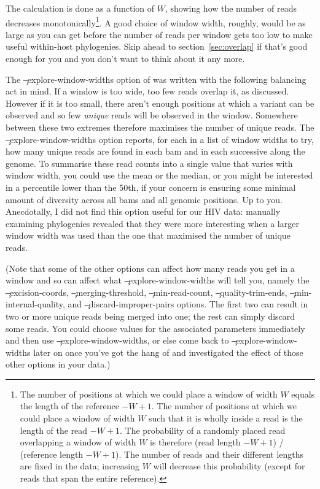 The calculation is done as a function of $W$, showing how the number of reads decreases monotonically\footnote{
The number of positions at which we could place a window of width $W$ equals the length of the reference $- W + 1$.
The number of positions at which we could place a window of width $W$ such that it is wholly inside a read is the length of the read $- W + 1$.
The probability of a randomly placed read overlapping a window of width $W$ is therefore (read length $- W + 1$) / (reference length $- W + 1$).
The number of reads and their different lengths are fixed in the data; increasing $W$ will decrease this probability (except for reads that span the entire reference).}.
A good choice of window width, roughly, would be as large as you can get before the number of reads per window gets too low to make useful within-host phylogenies.
Skip ahead to section~\ref{sec:overlap} if that's good enough for you and you don't want to think about it any more.

The \c{--explore-window-widths} option of \pmt was written with the following balancing act in mind.
If a window is too wide, too few reads overlap it, as discussed.
However if it is too small, there aren't enough positions at which a variant can be observed and so few {\it unique} reads will be observed in the window.
Somewhere between these two extremes therefore maximises the number of unique reads.
The \c{--explore-window-widths} option reports, for each in a list of window widths to try, how many unique reads are found in each bam and in each successive along the genome.
To summarise these read counts into a single value that varies with window width, you could use the mean or the median, or you might be interested in a percentile lower than the 50th, if your concern is ensuring some minimal amount of diversity across all bams and all genomic positions.
Up to you.
Anecdotally, I did not find this option useful for our HIV data: manually examining phylogenies revealed that they were more interesting when a larger window width was used than the one that maximised the number of unique reads.

(Note that some of the other options can affect how many reads you get in a window and so can affect what \c{--explore-window-widths} will tell you, namely the \c{--excision-coords}, \c{--merging-threshold}, \c{--min-read-count}, \c{--quality-trim-ends}, \c{--min-internal-quality}, and \c{--discard-improper-pairs} options.
The first two can result in two or more unique reads being merged into one; the rest can simply discard some reads.
You could choose values for the associated parameters immediately and then use \c{--explore-window-widths}, or else come back to \c{--explore-window-widths} later on once you've got the hang of \pmt and investigated the effect of those other options in your data.)  

